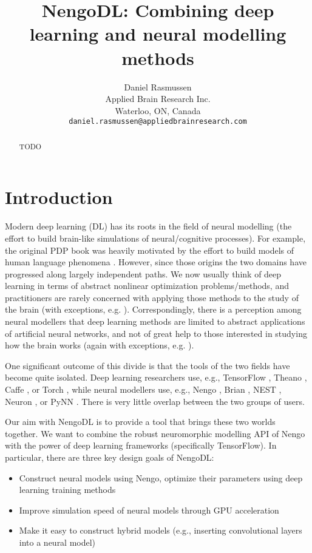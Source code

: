 \documentclass{article}
\title{NengoDL: Combining deep learning and neural modelling methods}
\author{
  Daniel Rasmussen \\
  Applied Brain Research Inc.\\
  Waterloo, ON, Canada \\
  \texttt{daniel.rasmussen@appliedbrainresearch.com}
}
\begin{document}
\maketitle

\begin{abstract}
  TODO
\end{abstract}

\section{Introduction}

Modern deep learning (DL) has its roots in the field of neural modelling (the effort to build brain-like simulations of neural/cognitive processes).  For example, the original PDP book was heavily motivated by the effort to build models of human language phenomena \citep{needcitation}.  However, since those origins the two domains have progressed along largely independent paths.  We now usually think of deep learning in terms of abstract nonlinear optimization problems/methods, and practitioners are rarely concerned with applying those methods to the study of the brain (with exceptions, e.g. \citet{needcitation}).  Correspondingly, there is a perception among neural modellers that deep learning methods are limited to abstract applications of artificial neural networks, and not of great help to those interested in studying how the brain works (again with exceptions, e.g. \citet{needcitation}).

One significant outcome of this divide is that the tools of the two fields have become quite isolated.  Deep learning researchers use, e.g., TensorFlow \citep{Abadi2016}, Theano \citep{needcitation}, Caffe \citep{needcitation}, or Torch \citep{needcitation}, while neural modellers use, e.g., Nengo \citep{Bekolay2014}, Brian \citep{needcitation}, NEST \citep{needcitation}, Neuron \citep{needcitation}, or PyNN \citep{needcitation}. There is very little overlap between the two groups of users.

Our aim with NengoDL is to provide a tool that brings these two worlds together.  We want to combine the robust neuromorphic modelling API of Nengo with the power of deep learning frameworks (specifically TensorFlow).  In particular, there are three key design goals of NengoDL:

\begin{itemize}
\item Construct neural models using Nengo, optimize their parameters using deep learning training methods
\item Improve simulation speed of neural models through GPU acceleration
\item Make it easy to construct hybrid models (e.g., inserting convolutional layers into a neural model)
\end{itemize}
\end{document}
